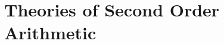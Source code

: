 \documentclass{amsart}
\begin{document}
	
		
		
		
		
		
	
	
	\newpage
	
	\section{Theories of Second Order Arithmetic}
	
\end{document}
